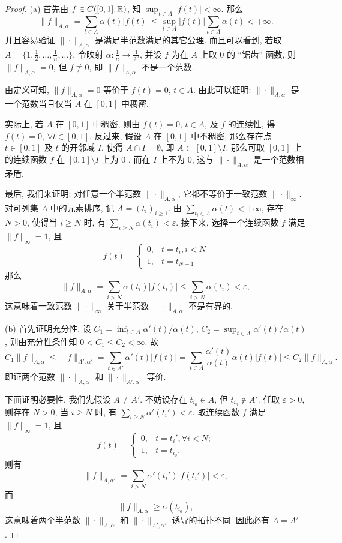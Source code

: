 \begin{proof}
    (a) 首先由 $f \in C([0,1], \mathbb{R})$, 知 $\sup_{t \in A}|f(t)|<\infty$. 那么
    \[\|f\|_{A,\alpha}=\sum_{t\in A}\alpha(t)|f(t)|\leq\sup_{t\in A}|f(t)|\sum_{t \in A} \alpha(t)<+\infty.\]
    并且容易验证 $\|\cdot\|_{A, \alpha}$ 是满足半范数满足的其它公理. 
    而且可以看到, 若取 $A=\{1,\frac{1}{2},\ldots,\frac{1}{n},\ldots\}$, 
    令映射 $\alpha: \frac{1}{n} \rightarrow \frac{1}{2^{n}}$, 
    并设 $f$ 为在 $A$ 上取 $0$ 的 “锯齿” 函数, 则 $\|f\|_{A,\alpha}=0$, 但 $f\not\equiv 0$, 即 $\|f\|_{A,\alpha}$ 不是一个范数.

    由定义可知, $\|f\|_{A, \alpha}=0$ 等价于 $f(t)=0$, $t\in A$. 由此可以证明: $\|\cdot\|_{A, \alpha}$ 
    是一个范数当且仅当 $A$ 在 $[0,1]$ 中稠密.

    实际上, 若 $A$ 在 $[0,1]$ 中稠密, 则由 $f(t)=0$, $t\in A$, 及 $f$ 的连续性, 得 $f(t)=0$, $\forall t \in[0,1]$. 
    反过来, 假设 $A$ 在 $[0,1]$ 中不稠密, 那么存在点 $t\in[0,1]$
    及 $t$ 的开邻域 $I$, 使得 $A\cap I=\emptyset$, 即 $A \subset[0,1]\setminus I$.
    那么可取 $[0,1]$ 上的连续函数 $f$ 在 $[0,1]\setminus I$ 上为 $0$ , 而在 $I$ 上不为 $0$, 
    这与 $\|\cdot\|_{A,\alpha}$ 是一个范数相矛盾.

    最后, 我们来证明: 对任意一个半范数 $\|\cdot\|_{A,\alpha}$, 它都不等价于一致范数 $\|\cdot\|_{\infty}$.
    对可列集 $A$ 中的元素排序, 记 $A=(t_{i})_{i\geq 1}$. 
    由 $\sum_{t_i\in A} \alpha(t)<+\infty$, 存在 $N>0$, 使得当 $i\geq N$ 时, 
    有 $\sum_{i \geq N} \alpha(t_i)<\varepsilon$. 接下来, 选择一个连续函数 $f$ 满足 $\|f\|_{\infty}=1$, 且
    \[
    f(t)= \begin{cases}0, & t=t_{i}, i<N \\ 1, & t=t_{N+1}\end{cases}
    \]
    那么
    \[
    \|f\|_{A,\alpha}=\sum_{i>N} \alpha(t_i)|f(t_i)|\leq\sum_{i>N} \alpha(t_i)<\varepsilon,
    \]
    这意味着一致范数 $\|\cdot\|_{\infty}$ 关于半范数 $\|\cdot\|_{A,\alpha}$ 不是有界的.

    (b) 首先证明充分性. 设 $C_1=\inf_{t\in A}\alpha'(t)/\alpha(t)$, 
    $C_{2}=\sup_{t \in A} \alpha'(t)/\alpha(t)$, 则由充分性条件知 $0<C_1\leq C_2<\infty$. 故
    \[C_{1}\|f\|_{A,\alpha}\leq\|f\|_{A',\alpha'}=\sum_{t\in A'} \alpha'(t)|f(t)|=\sum_{t\in A} \frac{\alpha'(t)}{\alpha(t)} \alpha(t)|f(t)|\leq C_{2}\|f\|_{A,\alpha}.\]
    即证两个范数 $\|\cdot\|_{A, \alpha}$ 和 $\|\cdot\|_{A', \alpha'}$ 等价.

    下面证明必要性, 我们先假设 $A\neq A'$. 
    不妨设存在 $t_{i_0}\in A$, 但 $t_{i_{0}}\notin A'$. 任取 $\varepsilon>0$, 则存在 $N>0$, 
    当 $i\geq N$ 时, 有 $\sum_{i\geq N} \alpha'(t_i')<\varepsilon$. 取连续函数 $f$ 满足 $\|f\|_{\infty}=1$, 且
    \[f(t)=\begin{cases} 0, & t=t_{i}',\forall i<N; \\ 1, & t=t_{i_{0}} .\end{cases}\]
    则有
    \[\|f\|_{A,\alpha'}=\sum_{i>N} \alpha'(t_{i}')|f(t_{i}')|<\varepsilon,\]
    而
    \[\|f\|_{A, \alpha}\geq\alpha(t_{i_0}),\]
    这意味着两个半范数 $\|\cdot\|_{A, \alpha}$ 和 $\|\cdot\|_{A', \alpha'}$ 诱导的拓扑不同. 因此必有 $A=A'$.


\end{proof}
